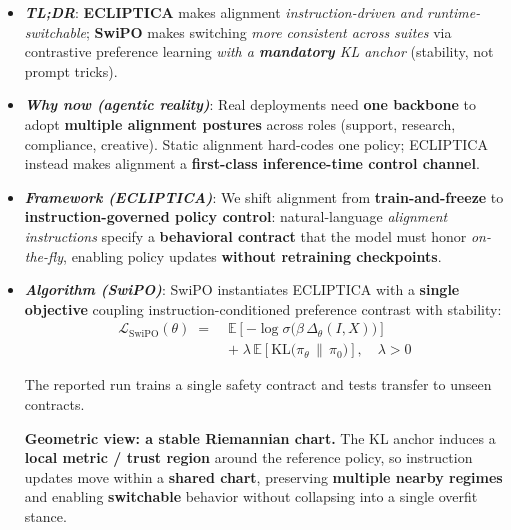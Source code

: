 \documentclass[11pt]{article}
\begin{document}
\begin{defin}
\scriptsize
\vspace{-2mm}
\begin{itemize}[left=-4pt,itemsep=0pt,topsep=0pt,parsep=0pt]

\item[\faBolt] \textbf{\textit{TL;DR}}:
\textbf{ECLIPTICA} makes alignment \emph{instruction-driven and runtime-switchable};
\textbf{SwiPO} makes switching \emph{more consistent across suites} via contrastive preference learning \emph{with a \textbf{mandatory} KL anchor} (stability, not prompt tricks).

\item[\faGlobeAmericas] \textbf{\textit{Why now (agentic reality)}}:
Real deployments need \textbf{one backbone} to adopt \textbf{multiple alignment postures} across roles (support, research, compliance, creative).
Static alignment hard-codes one policy; ECLIPTICA instead makes alignment a \textbf{first-class inference-time control channel}.

\item[\faCompass] \textbf{\textit{Framework (ECLIPTICA)}}:
We shift alignment from \textbf{train-and-freeze} to \textbf{instruction-governed policy control}:
natural-language \emph{alignment instructions} specify a \textbf{behavioral contract} that the model must honor \emph{on-the-fly}, enabling policy updates \textbf{without retraining checkpoints}.

\item[\faCogs] \textbf{\textit{Algorithm (SwiPO)}}:
SwiPO instantiates ECLIPTICA with a \textbf{single objective} coupling instruction-conditioned preference contrast with stability:
\vspace{-1em}
\[
\boxed{
\begin{aligned}
\mathcal{L}_{\mathrm{SwiPO}}(\theta)
\;=\;&
\mathbb{E}\!\left[-\log\sigma\!\big(\beta\,\Delta_\theta(I,X)\big)\right]
\\[0.25em]
&+\;
\lambda\,\mathbb{E}\!\left[\mathrm{KL}\!\big(\pi_\theta \,\|\, \pi_0\big)\right],\quad \lambda>0
\end{aligned}
}
\]
\vspace{-1.5em}

The reported run trains a single safety contract and tests transfer to unseen contracts.

\textbf{Geometric view: a stable Riemannian chart.} The KL anchor induces a \textbf{local metric / trust region} around the reference policy, so instruction updates move within a \textbf{shared chart}, preserving \textbf{multiple nearby regimes} and enabling \textbf{switchable} behavior without collapsing into a single overfit stance.



\end{itemize}
\end{defin}
\end{document}
